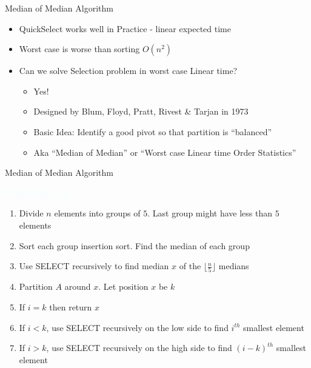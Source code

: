 \documentclass{beamer}
\newcommand{\tblue}[1]{{\Large {\textcolor{azure}{#1}}}}
\begin{document}
\begin{frame}{Median of Median Algorithm}
\begin{itemize}
    \item QuickSelect works well in Practice - linear expected time
    \item Worst case is worse than sorting $O(n^2)$
    \item Can we solve Selection problem in worst case Linear time?
    \pause
    \begin{itemize}
        \item Yes!
        \item Designed by Blum, Floyd, Pratt, Rivest \& Tarjan in 1973
        \item Basic Idea: Identify a good pivot so that partition is ``balanced''
        \item Aka ``Median of Median'' or ``Worst case Linear time Order Statistics''
    \end{itemize}
\end{itemize}
\end{frame}



\begin{frame}{Median of Median Algorithm}

\tblue{SELECT(A, i, n):}
\begin{enumerate}
    \item Divide $n$ elements into groups of $5$. Last group might have less than $5$ elements
    \item Sort each group insertion sort. Find the median of each group
    \item Use SELECT recursively to find median $x$ of the $\lfloor \frac{n}{5} \rfloor$ medians
    \item Partition $A$ around $x$. Let position $x$ be $k$ 
    \item If $i=k$ then return $x$
    \item If $i < k$, use SELECT recursively on the low side to find $i^{th}$ smallest element
    \item If $i > k$, use SELECT recursively on the high side to find $(i-k)^{th}$ smallest element 
\end{enumerate}

\end{frame}
\end{document}
